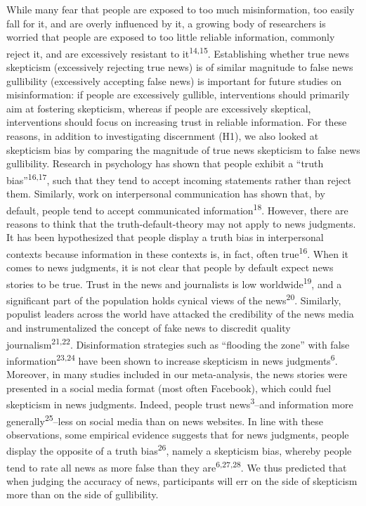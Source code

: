 \documentclass[
  doc,floatsintext]{apa6}
\begin{document}
While many fear that people are exposed to too much misinformation, too easily fall for it, and are overly influenced by it, a growing body of researchers is worried that people are exposed to too little reliable information, commonly reject it, and are excessively resistant to it\textsuperscript{14,15}. Establishing whether true news skepticism (excessively rejecting true news) is of similar magnitude to false news gullibility (excessively accepting false news) is important for future studies on misinformation: if people are excessively gullible, interventions should primarily aim at fostering skepticism, whereas if people are excessively skeptical, interventions should focus on increasing trust in reliable information. For these reasons, in addition to investigating discernment (H1), we also looked at skepticism bias by comparing the magnitude of true news skepticism to false news gullibility. Research in psychology has shown that people exhibit a ``truth bias''\textsuperscript{16,17}, such that they tend to accept incoming statements rather than reject them. Similarly, work on interpersonal communication has shown that, by default, people tend to accept communicated information\textsuperscript{18}. However, there are reasons to think that the truth-default-theory may not apply to news judgments. It has been hypothesized that people display a truth bias in interpersonal contexts because information in these contexts is, in fact, often true\textsuperscript{16}. When it comes to news judgments, it is not clear that people by default expect news stories to be true. Trust in the news and journalists is low worldwide\textsuperscript{19}, and a significant part of the population holds cynical views of the news\textsuperscript{20}. Similarly, populist leaders across the world have attacked the credibility of the news media and instrumentalized the concept of fake news to discredit quality journalism\textsuperscript{21,22}. Disinformation strategies such as ``flooding the zone'' with false information\textsuperscript{23,24} have been shown to increase skepticism in news judgments\textsuperscript{6}. Moreover, in many studies included in our meta-analysis, the news stories were presented in a social media format (most often Facebook), which could fuel skepticism in news judgments. Indeed, people trust news\textsuperscript{3}--and information more generally\textsuperscript{25}--less on social media than on news websites. In line with these observations, some empirical evidence suggests that for news judgments, people display the opposite of a truth bias\textsuperscript{26}, namely a skepticism bias, whereby people tend to rate all news as more false than they are\textsuperscript{6,27,28}. We thus predicted that when judging the accuracy of news, participants will err on the side of skepticism more than on the side of gullibility.
\end{document}
